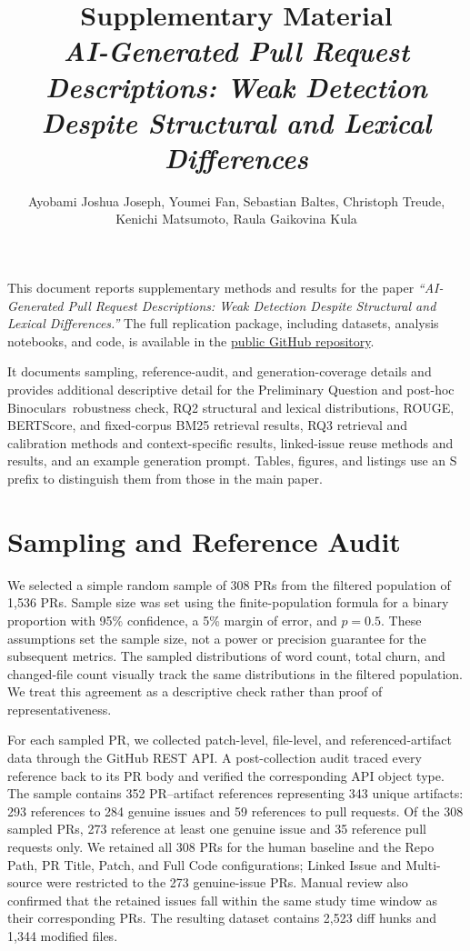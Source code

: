 \documentclass[11pt,a4paper]{article}
\title{\textbf{Supplementary Material}\\[0.5em]
\large\textit{AI-Generated Pull Request Descriptions: Weak Detection Despite Structural and Lexical Differences}}
\author{Ayobami Joshua Joseph, Youmei Fan, Sebastian Baltes, Christoph Treude,\\
Kenichi Matsumoto, Raula Gaikovina Kula}
\date{}
\newcommand{\binocularsDetector}{Binoculars}
\begin{document}
\maketitle

This document reports supplementary methods and results for the paper
\textit{``AI-Generated Pull Request Descriptions: Weak Detection Despite Structural and Lexical Differences.''}
The full replication package, including datasets, analysis notebooks, and code, is available
in the \href{https://github.com/NAIST-SE/generated-ai-pull-requests-replication}{public
GitHub repository}.

It documents sampling, reference-audit, and generation-coverage details and provides additional descriptive detail for the Preliminary Question and post-hoc
\binocularsDetector~robustness check, RQ2 structural and lexical distributions,
ROUGE, BERTScore, and fixed-corpus BM25 retrieval results,
RQ3 retrieval and calibration methods and context-specific results, linked-issue reuse methods and results, and an example generation prompt. Tables, figures, and listings use an S prefix to
distinguish them from those in the main paper.

\section{Sampling and Reference Audit}
\label{sec:sampling_reference_audit}

We selected a simple random sample of 308 PRs from the filtered population of 1,536 PRs. Sample size was set using the finite-population formula for a binary proportion with 95\% confidence, a 5\% margin of error, and $p=0.5$. These assumptions set the sample size, not a power or precision guarantee for the subsequent metrics. The sampled distributions of word count, total churn, and changed-file count visually track the same distributions in the filtered population. We treat this agreement as a descriptive check rather than proof of representativeness.

For each sampled PR, we collected patch-level, file-level, and referenced-artifact data through the GitHub REST API. A post-collection audit traced every reference back to its PR body and verified the corresponding API object type. The sample contains 352 PR--artifact references representing 343 unique artifacts: 293 references to 284 genuine issues and 59 references to pull requests. Of the 308 sampled PRs, 273 reference at least one genuine issue and 35 reference pull requests only. We retained all 308 PRs for the human baseline and the Repo Path, PR Title, Patch, and Full Code configurations; Linked Issue and Multi-source were restricted to the 273 genuine-issue PRs. Manual review also confirmed that the retained issues fall within the same study time window as their corresponding PRs. The resulting dataset contains 2,523 diff hunks and 1,344 modified files.
\end{document}
